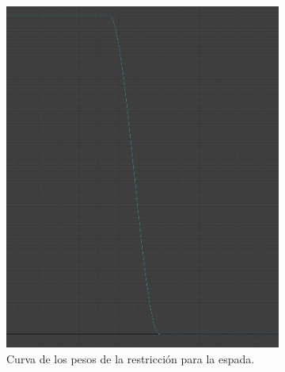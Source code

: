 \begin{figure}[H]
    \centering
    \begin{subfigure}[t]{0.48\textwidth}
        \centering
        \includegraphics[width=\textwidth]{imagenes/camara/target/pos0.png}
        \caption{Curva de los pesos de la restricción para la espada.}
    \end{subfigure}
    \hfill
    \begin{subfigure}[t]{0.48\textwidth}
        \centering

\end{subfigure}
\end{figure}
